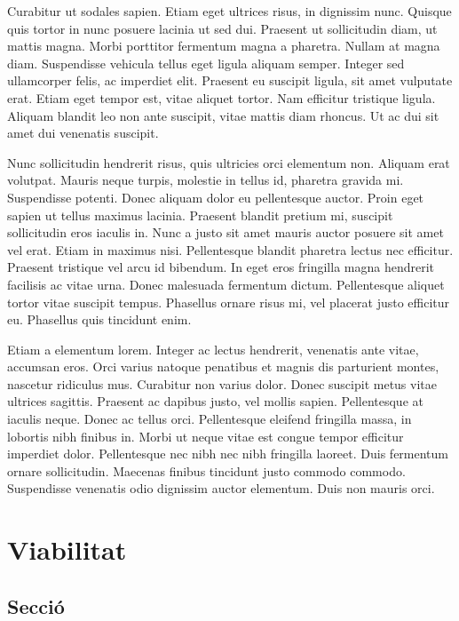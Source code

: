 \documentclass[a4paper,12pt,twoside]{ThesisStyle}
\begin{document}
Curabitur ut sodales sapien. Etiam eget ultrices risus, in dignissim nunc. Quisque quis tortor in nunc posuere lacinia ut sed dui. Praesent ut sollicitudin diam, ut mattis magna. Morbi porttitor fermentum magna a pharetra. Nullam at magna diam. Suspendisse vehicula tellus eget ligula aliquam semper. Integer sed ullamcorper felis, ac imperdiet elit. Praesent eu suscipit ligula, sit amet vulputate erat. Etiam eget tempor est, vitae aliquet tortor. Nam efficitur tristique ligula. Aliquam blandit leo non ante suscipit, vitae mattis diam rhoncus. Ut ac dui sit amet dui venenatis suscipit.

Nunc sollicitudin hendrerit risus, quis ultricies orci elementum non. Aliquam erat volutpat. Mauris neque turpis, molestie in tellus id, pharetra gravida mi. Suspendisse potenti. Donec aliquam dolor eu pellentesque auctor. Proin eget sapien ut tellus maximus lacinia. Praesent blandit pretium mi, suscipit sollicitudin eros iaculis in. Nunc a justo sit amet mauris auctor posuere sit amet vel erat. Etiam in maximus nisi. Pellentesque blandit pharetra lectus nec efficitur. Praesent tristique vel arcu id bibendum. In eget eros fringilla magna hendrerit facilisis ac vitae urna. Donec malesuada fermentum dictum. Pellentesque aliquet tortor vitae suscipit tempus. Phasellus ornare risus mi, vel placerat justo efficitur eu. Phasellus quis tincidunt enim.

Etiam a elementum lorem. Integer ac lectus hendrerit, venenatis ante vitae, accumsan eros. Orci varius natoque penatibus et magnis dis parturient montes, nascetur ridiculus mus. Curabitur non varius dolor. Donec suscipit metus vitae ultrices sagittis. Praesent ac dapibus justo, vel mollis sapien. Pellentesque at iaculis neque. Donec ac tellus orci. Pellentesque eleifend fringilla massa, in lobortis nibh finibus in. Morbi ut neque vitae est congue tempor efficitur imperdiet dolor. Pellentesque nec nibh nec nibh fringilla laoreet. Duis fermentum ornare sollicitudin. Maecenas finibus tincidunt justo commodo commodo. Suspendisse venenatis odio dignissim auctor elementum. Duis non mauris orci.

\chapter{Viabilitat}
\label{cap:viabilitat}

\section{Secció}
\end{document}
